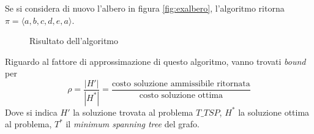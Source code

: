 Se si considera di nuovo l'albero in figura \ref{fig:exalbero}, l'algoritmo ritorna
$ \pi = \langle a,b,c,d,e,a \rangle$.

\begin{figure}[H]
    \centering
    \caption{Risultato dell'algoritmo}
    \label{fig:approxttsp2}
\end{figure}

Riguardo al fattore di approssimazione di questo algoritmo, vanno trovati \emph{bound} per
\begin{equation*}
    \rho =
    \frac{
    |H'|
    }{
    |H^*|
    }
    =
    \frac{
        \text{costo soluzione ammissibile ritornata}
    }{
        \text{costo soluzione ottima}
    }
\end{equation*}
Dove si indica $H'$ la soluzione trovata al problema $T\_TSP$, $H^*$ la soluzione ottima al problema, $T^*$ il \emph{minimum spanning tree} del grafo.

